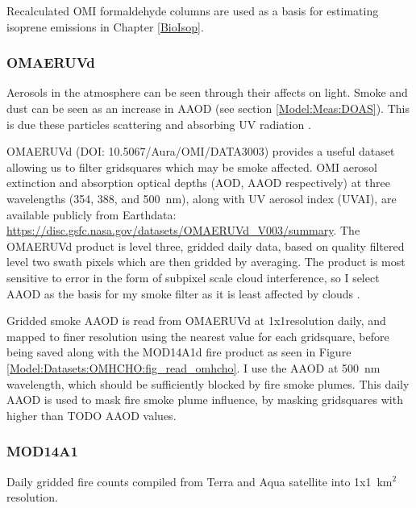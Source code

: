       Recalculated OMI formaldehyde columns are used as a basis for estimating isoprene emissions in Chapter \ref{BioIsop}.
    
    \subsubsection{OMAERUVd}
      \label{Model:Datasets:OMAERUVd}
      
      Aerosols in the atmosphere can be seen through their affects on light. 
      Smoke and dust can be seen as an increase in AAOD (see section \ref{Model:Meas:DOAS}).
      This is due these particles scattering and absorbing UV radiation \parencite{Ahn2008}.
      
      
      OMAERUVd (DOI: 10.5067/Aura/OMI/DATA3003) provides a useful dataset allowing us to filter gridsquares which may be smoke affected.
      OMI aerosol extinction and absorption optical depths (AOD, AAOD respectively) at three wavelengths (354, 388, and 500~nm), along with UV aerosol index (UVAI), are available publicly from Earthdata: \url{https://disc.gsfc.nasa.gov/datasets/OMAERUVd_V003/summary}.
      The OMAERUVd product is level three, gridded daily data, based on quality filtered level two swath pixels which are then gridded by averaging.
      The product is most sensitive to error in the form of subpixel scale cloud interference, so I select AAOD as the basis for my smoke filter as it is least affected by clouds \parencite{Ahn2008}.
      
      Gridded smoke AAOD is read from OMAERUVd at 1x1\degr resolution daily, and mapped to finer resolution using the nearest value for each gridsquare, before being saved along with the MOD14A1d fire product as seen in Figure \ref{Model:Datasets:OMHCHO:fig_read_omhcho}.
      I use the AAOD at 500~nm wavelength, which should be sufficiently blocked by fire smoke plumes.
      This daily AAOD is used to mask fire smoke plume influence, by masking gridsquares with higher than TODO AAOD values.
    
    \subsubsection{MOD14A1}
      \label{Model:Datasets:MOD14A1}
      Daily gridded fire counts compiled from Terra and Aqua satellite into 1x1~km$^2$ resolution.
  
